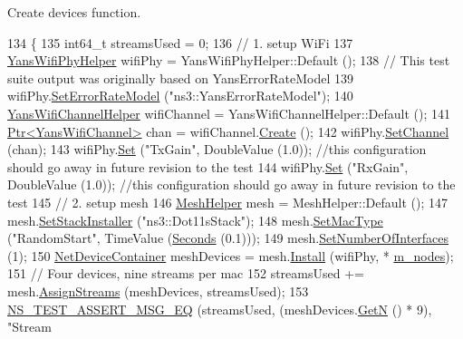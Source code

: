 Create devices function. 


\begin{DoxyCode}
134 \{
135   int64\_t streamsUsed = 0;
136   \textcolor{comment}{// 1. setup WiFi}
137   \hyperlink{classns3_1_1YansWifiPhyHelper}{YansWifiPhyHelper} wifiPhy = YansWifiPhyHelper::Default ();
138   \textcolor{comment}{// This test suite output was originally based on YansErrorRateModel}
139   wifiPhy.\hyperlink{classns3_1_1WifiPhyHelper_a219d3ae5881842aa42ea341b985ce114}{SetErrorRateModel} (\textcolor{stringliteral}{"ns3::YansErrorRateModel"});
140   \hyperlink{classns3_1_1YansWifiChannelHelper}{YansWifiChannelHelper} wifiChannel = YansWifiChannelHelper::Default ();
141   \hyperlink{classns3_1_1Ptr}{Ptr<YansWifiChannel>} chan = wifiChannel.\hyperlink{classns3_1_1YansWifiChannelHelper_a0532e292ab9452f3cf630c848708e563}{Create} ();
142   wifiPhy.\hyperlink{classns3_1_1YansWifiPhyHelper_ad2e9a27587dd4ff320435c93cc2676de}{SetChannel} (chan);
143   wifiPhy.\hyperlink{classns3_1_1WifiPhyHelper_a2527d6d7b29f717fd7436166c5f05f1a}{Set} (\textcolor{stringliteral}{"TxGain"}, DoubleValue (1.0)); \textcolor{comment}{//this configuration should go away in future revision to
       the test}
144   wifiPhy.\hyperlink{classns3_1_1WifiPhyHelper_a2527d6d7b29f717fd7436166c5f05f1a}{Set} (\textcolor{stringliteral}{"RxGain"}, DoubleValue (1.0)); \textcolor{comment}{//this configuration should go away in future revision to
       the test}
145   \textcolor{comment}{// 2. setup mesh}
146   \hyperlink{classns3_1_1MeshHelper}{MeshHelper} mesh = MeshHelper::Default ();
147   mesh.\hyperlink{classns3_1_1MeshHelper_ac1074aff829d0cde1659bdef572880ca}{SetStackInstaller} (\textcolor{stringliteral}{"ns3::Dot11sStack"});
148   mesh.\hyperlink{classns3_1_1MeshHelper_a549d568927a88e95a721f2be58232c10}{SetMacType} (\textcolor{stringliteral}{"RandomStart"}, TimeValue (\hyperlink{group__timecivil_ga33c34b816f8ff6628e33d5c8e9713b9e}{Seconds} (0.1)));
149   mesh.\hyperlink{classns3_1_1MeshHelper_adfc08b62a8d6e835d0fbbac7a349ef5f}{SetNumberOfInterfaces} (1);
150   \hyperlink{classns3_1_1NetDeviceContainer}{NetDeviceContainer} meshDevices = mesh.\hyperlink{classns3_1_1MeshHelper_a7b33f6ca7b6842b3def4479bc7526f2c}{Install} (wifiPhy, *
      \hyperlink{classHwmpDoRfRegressionTest_a903b552fef92a7ca46584cdf2282f82e}{m\_nodes});
151   \textcolor{comment}{// Four devices, nine streams per mac}
152   streamsUsed += mesh.\hyperlink{classns3_1_1MeshHelper_a93e9c88a375a86c621a494aafe68882e}{AssignStreams} (meshDevices, streamsUsed);
153   \hyperlink{group__testing_ga2a9d78cffb3db8e867c35fff0b698cf5}{NS\_TEST\_ASSERT\_MSG\_EQ} (streamsUsed, (meshDevices.\hyperlink{classns3_1_1NetDeviceContainer_a74cafc212479bc38976bebd118e856b9}{GetN} () * 9), \textcolor{stringliteral}{"Stream
}
\end{DoxyCode}
